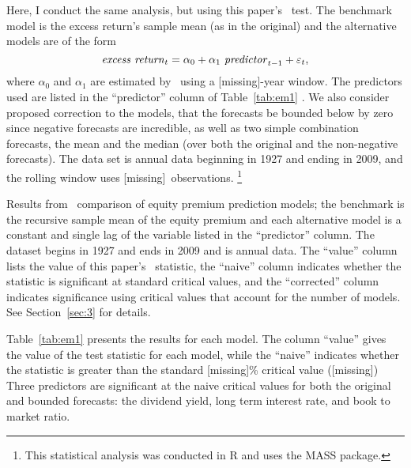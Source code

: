 \documentclass[12pt,fleqn]{article}
\providecommand\bootsize{[missing]}
\providecommand\windowlength{[missing]}
\providecommand\empiricaltable{[missing]}
\providecommand\naivecriticalvalue{[missing]}
\begin{document}
Here, I conduct the same analysis, but using this paper's \mds\ test.
The benchmark model is the excess return's sample mean (as in the
original) and the alternative models are of the form
\begin{equation*}
  \mathit{excess~return}_{t} = \alpha_{0} + \alpha_{1}\
  \mathit{predictor}_{t-1} + \varepsilon_{t},
\end{equation*}
where $\alpha_{0}$ and
$\alpha_{1}$ are estimated by \ols\ using a \windowlength-year window.
The predictors used are listed in the ``predictor'' column of
Table~\ref{tab:em1} \citep[see][for a detailed description of the
variables]{GoW:08}.  We also consider \citepos{CaT:08} proposed
correction to the models, that the forecasts be bounded below by zero
since negative forecasts are incredible, as well as two simple
combination forecasts, the mean and the median (over both the original
and the non-negative forecasts).  The data set is annual data
beginning in 1927 and ending in 2009, and the rolling window uses
\windowlength\ observations.%
\footnote{This statistical analysis was conducted in R \citep{R} and
  uses the MASS \citep[7.3-22]{VeR:02} package.} %

\begin{table}[tb!]
  \centering
  \empiricaltable
\caption{Results from \oos\ comparison of equity premium prediction
  models; the benchmark is the recursive sample mean of the equity
  premium and each alternative model is a constant and single lag of
  the variable listed in the ``predictor'' column.  The dataset begins
  in 1927 and ends in 2009 and is annual data. The ``value'' column
  lists the value of this paper's \oos\ statistic, the ``naive''
  column indicates whether the statistic is significant at standard
  critical values, and the ``corrected'' column indicates significance
  using critical values that
  account for the number of models.  See Section~\ref{sec:3} for details.}
\label{tab:em1}
\end{table}

Table~\ref{tab:em1} presents the results for each model.  The column
``value'' gives the value of the test statistic for each model, while
the ``naive'' indicates whether the statistic is greater than the
standard \bootsize\% critical value (\naivecriticalvalue) Three
predictors are
significant at the naive critical values for both the original and
bounded forecasts: the dividend yield, long term interest rate, and
book to market ratio.
\end{document}
